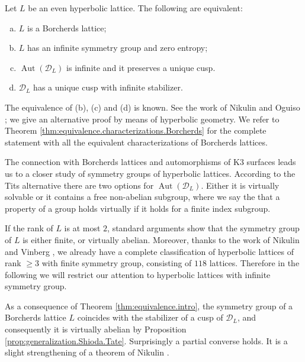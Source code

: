 \documentclass[11pt,letterpaper]{amsart}
\DeclareMathOperator{\Aut}{Aut}
\begin{document}
\begin{theorem} \label{thm:equivalence.intro}
Let $L$ be an even hyperbolic lattice.
The following are equivalent:
\begin{enumerate}[(a)]
    \item $L$ is a Borcherds lattice;
    \item $L$ has an infinite symmetry group and zero entropy;
    \item $\Aut(\mathcal{D}_L)$ is infinite and it preserves a unique cusp.
    \item $\mathcal{D}_L$ has a unique cusp with infinite stabilizer.
\end{enumerate}
\end{theorem}
The equivalence of (b), (c) and (d) is known. See the work of Nikulin  \cite[Theorem~9.1.1]{nikulin.factor.groups} and Oguiso \cite[Theorem~1.4]{oguiso.entropy}; we give an alternative proof by means of hyperbolic geometry.
We refer to Theorem \ref{thm:equivalence.characterizations.Borcherds} for the complete statement with all the equivalent characterizations of Borcherds lattices.

The connection with Borcherds lattices and automorphisms of K3 surfaces leads us to a closer study of symmetry groups of hyperbolic lattices.
According to the Tits alternative \cite{detinko.flannery.obrien.tits} there are two options for $\Aut(\mathcal{D}_L)$. Either it is virtually solvable or it contains a free non-abelian subgroup, where we say the that a property of a group holds virtually if it holds for a finite index subgroup.

If the rank of $L$ is at most $2$, standard arguments show that the symmetry group of $L$ is either finite, or virtually abelian.
Moreover, thanks to the work of Nikulin \cite{nikulin.finite.aut.3,nikulin.finite.aut.greater.5} and Vinberg \cite{vinberg.finite.aut.4}, we already have a complete classification of hyperbolic lattices of rank $\ge 3$ with finite symmetry group, consisting of $118$ lattices. Therefore in the following we will restrict our attention to hyperbolic lattices with infinite symmetry group.

As a consequence of Theorem \ref{thm:equivalence.intro}, the symmetry group of a Borcherds lattice $L$ coincides with the stabilizer of a cusp of $\mathcal{D}_L$, and consequently it is virtually abelian by Proposition \ref{prop:generalization.Shioda.Tate}. Surprisingly a partial converse holds. It is a slight strengthening of a theorem of Nikulin \cite[Theorem~9.1.1]{nikulin.factor.groups}.
\end{document}
